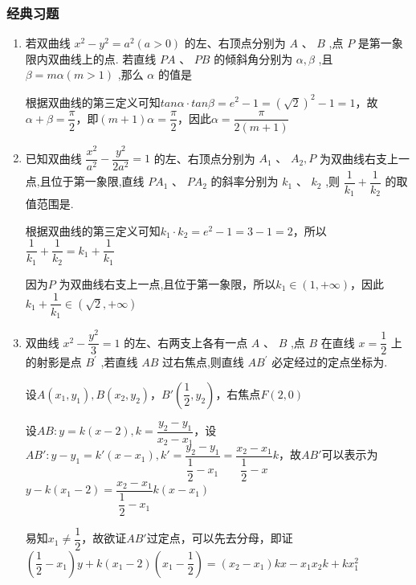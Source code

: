 \subsubsection*{经典习题}
\begin{enumerate}
    \item 若双曲线 ${x}^{2} - {y}^{2} = {a}^{2}\left( {a > 0}\right)$ 的左、右顶点分别为 $A\text{ 、 }B$ ,点 $P$ 是第一象限内双曲线上的点. 若直线 ${PA}\text{ 、 }{PB}$ 的倾斜角分别为 $\alpha ,\beta$ ,且 $\beta  = {m\alpha }\left( {m > 1}\right)$ ,那么 $\alpha$ 的值是
    \begin{jieda}
        根据双曲线的第三定义可知$tan\alpha \cdot tan\beta = e^2 - 1 = (\sqrt{2})^2 - 1 = 1$，故$\alpha + \beta = \dfrac{\pi}{2}$，即$(m+1)\alpha = \dfrac{\pi}{2}$，因此$\alpha = \dfrac{\pi}{2(m+1)}$
    \end{jieda}
    \item 已知双曲线 $\dfrac{{x}^{2}}{{a}^{2}} - \dfrac{{y}^{2}}{2{a}^{2}} = 1$ 的左、右顶点分别为 ${A}_{1}\text{ 、 }{A}_{2},P$ 为双曲线右支上一点,且位于第一象限,直线 $P{A}_{1}\text{ 、 }P{A}_{2}$ 的斜率分别为 ${k}_{1}\text{ 、 }{k}_{2}$ ,则 $\dfrac{1}{{k}_{1}} + \dfrac{1}{{k}_{2}}$ 的取值范围是.
    \begin{jieda}
        根据双曲线的第三定义可知$k_1 \cdot k_2 = e^2 - 1 = 3 - 1 = 2$，所以$\dfrac{1}{k_1} + \dfrac{1}{k_2} = k_1 + \dfrac{1}{k_1}$

        因为$P$ 为双曲线右支上一点,且位于第一象限，所以$k_1 \in (1, +\infty)$，因此$k_1 + \dfrac{1}{k_1} \in (\sqrt{2}, +\infty)$
    \end{jieda}

    \item 双曲线 ${x}^{2} - \dfrac{{y}^{2}}{3} = 1$ 的左、右两支上各有一点 $A\text{ 、 }B$ ,点 $B$ 在直线 $x = \dfrac{1}{2}$ 上的射影是点 ${B}^{\prime }$ ,若直线 ${AB}$ 过右焦点,则直线 $A{B}^{\prime }$ 必定经过的定点坐标为.
    \begin{jieda}
        设$A(x_1, y_1), B(x_2, y_2)， B'\left(\dfrac{1}{2}, y_2\right)$，右焦点$F(2, 0)$

        设$AB: y = k(x-2), k = \dfrac{y_2 - y_1}{x_2 - x_1}$，设$AB': y - y_1 = k'(x - x_1), k' = \dfrac{y_2-y_1}{\dfrac{1}{2} - x_1} = \dfrac{x_2-x_1}{\dfrac{1}{2} - x}k$，故$AB'$可以表示为$y - k(x_1-2) = \dfrac{x_2-x_1}{\dfrac{1}{2} - x_1}k(x-x_1)$

        易知$x_1 \neq \dfrac{1}{2}$，故欲证$AB'$过定点，可以先去分母，即证$\left(\dfrac{1}{2} - x_1\right)y + k(x_1-2)\left(x_1 - \dfrac{1}{2}\right) = (x_2 - x_1)kx -x_1x_2k + kx_1^2$


\end{jieda}
\end{enumerate}
